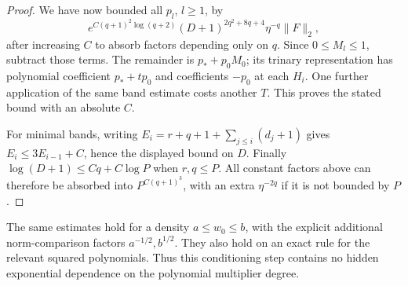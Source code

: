 \documentclass[11pt]{article}
\begin{document}
\begin{proof}
We have now bounded all $p_l$, $l\ge1$, by
\[
 e^{C(q+1)^2\log(q+2)}(D+1)^{2q^2+8q+4}\eta^{-q}\|F\|_2,
\]
after increasing $C$ to absorb factors depending only on $q$.
Since $0\le M_l\le1$, subtract those terms. The remainder is
$p_*+p_0M_0$; its trinary representation has polynomial coefficient
$p_*+tp_0$ and coefficients $-p_0$ at each $H_i$.
One further application of the same band estimate costs another $T$.
This proves the stated bound with an absolute $C$.

For minimal bands, writing
$E_i=r+q+1+\sum_{j\le i}(d_j+1)$ gives
$E_i\le3E_{i-1}+C$, hence the displayed bound on $D$.
Finally $\log(D+1)\le Cq+C\log P$ when $r,q\le P$.
All constant factors above can therefore be absorbed into
$P^{C(q+1)^3}$, with an extra $\eta^{-2q}$ if it is not bounded by $P$.
\end{proof}

The same estimates hold for a density $a\le w_0\le b$, with the
explicit additional norm-comparison factors $a^{-1/2},b^{1/2}$.
They also hold on an exact rule for the relevant squared polynomials.
Thus this conditioning step contains no hidden exponential dependence
on the polynomial multiplier degree.
\end{document}
